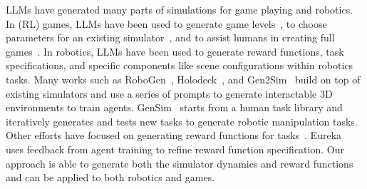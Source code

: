 \documentclass{article}
\theoremstyle{plain}
\theoremstyle{definition}
\theoremstyle{remark}
\begin{document}
LLMs have generated many parts of simulations for game playing and robotics.
In (RL) games, LLMs have been used to generate game levels~\cite{todd2023level, sudhakaran2023mariogpt}, to choose parameters for an existing simulator~\cite{zala2024EnvGen}, and to assist humans in creating full games~\cite{anjum2024inksplotch}.
In robotics, LLMs have been used to generate reward functions, task specifications, and specific components like scene configurations within robotics tasks. 
Many works such as RoboGen~\cite{wang2023robogen}, Holodeck~\cite{yang2023holodeck}, and Gen2Sim~\cite{katara2023gen2sim} build on top of existing simulators and use a series of prompts to generate interactable 3D environments to train agents. 
GenSim~\cite{wang2023gensim} starts from a human task library and iteratively generates and tests new tasks to generate robotic manipulation tasks.
Other efforts have focused on generating reward functions for tasks~\cite{ma2023eureka,kwon2023llmreward,ma2024dreureka}. 
Eureka~\cite{ma2023eureka} uses feedback from agent training to refine reward function specification. 
Our approach is able to generate both the simulator dynamics and reward functions and can be applied to both robotics and games.
\end{document}
